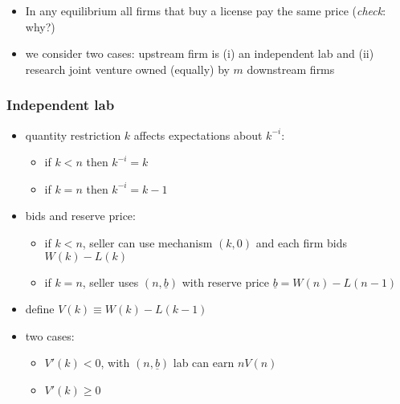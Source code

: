 \documentclass[11pt,english]{beamer}
\begin{document}
\begin{frame}[allowframebreaks]
\begin{itemize}
\item In any equilibrium all firms that buy a license pay the same price (\emph{check}: why?)\\
\label{sec-2-2-9}%
\item we consider two cases: upstream firm is (i) an independent lab and (ii) research joint venture owned (equally) by $m$ downstream firms\\
\label{sec-2-2-10}%
\end{itemize} %
\end{frame}
\begin{frame}[allowframebreaks]\frametitle{Independent lab}
\label{sec-2-3}
\begin{itemize}

\item quantity restriction $k$ affects expectations about $k^{-i}$:
\label{sec-2-3-1}%
\begin{itemize}

\item if $k<n$ then $k^{-i}=k$\\
\label{sec-2-3-1-1}%
\item if $k=n$ then $k^{-i}=k-1$\\
\label{sec-2-3-1-2}%
\end{itemize} %

\item bids and reserve price:
\label{sec-2-3-2}%
\begin{itemize}

\item if $k<n$, seller can use mechanism $(k,0)$ and each firm bids $W(k)-L(k)$\\
\label{sec-2-3-2-1}%
\item if $k=n$, seller uses $(n,\underline b)$ with reserve price $\underline b = W(n)-L(n-1)$\\
\label{sec-2-3-2-2}%
\end{itemize} %

\item define $V(k) \equiv W(k)-L(k-1)$\\
\label{sec-2-3-3}%
\item two cases:
\label{sec-2-3-4}%
\begin{itemize}

\item $V'(k) <0$, with $(n,\underline b)$ lab can earn $n V(n)$\\
\label{sec-2-3-4-1}%
\item $V'(k) \geq 0$
\label{sec-2-3-4-2}%
\begin{itemize}


\end{itemize}
\end{itemize}
\end{itemize}
\end{frame}
\end{document}
